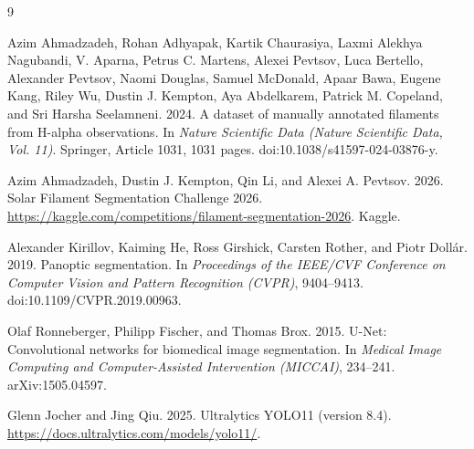\documentclass[sigconf]{acmart}
\begin{document}
\begin{thebibliography}{9}

Azim Ahmadzadeh, Rohan Adhyapak, Kartik Chaurasiya, Laxmi Alekhya Nagubandi, V. Aparna, Petrus C. Martens, Alexei Pevtsov, Luca Bertello, Alexander Pevtsov, Naomi Douglas, Samuel McDonald, Apaar Bawa, Eugene Kang, Riley Wu, Dustin J. Kempton, Aya Abdelkarem, Patrick M. Copeland, and Sri Harsha Seelamneni.
2024.
A dataset of manually annotated filaments from H-alpha observations.
In \emph{Nature Scientific Data (Nature Scientific Data, Vol. 11)}.
Springer, Article 1031, 1031 pages.
doi:10.1038/s41597-024-03876-y.

Azim Ahmadzadeh, Dustin J. Kempton, Qin Li, and Alexei A. Pevtsov.
2026.
Solar Filament Segmentation Challenge 2026.
\url{https://kaggle.com/competitions/filament-segmentation-2026}.
Kaggle.

Alexander Kirillov, Kaiming He, Ross Girshick, Carsten Rother, and Piotr Doll\'{a}r.
2019.
Panoptic segmentation.
In \emph{Proceedings of the IEEE/CVF Conference on Computer Vision and Pattern Recognition (CVPR)}, 9404--9413.
doi:10.1109/CVPR.2019.00963.

Olaf Ronneberger, Philipp Fischer, and Thomas Brox.
2015.
U-Net: Convolutional networks for biomedical image segmentation.
In \emph{Medical Image Computing and Computer-Assisted Intervention (MICCAI)}, 234--241.
arXiv:1505.04597.

Glenn Jocher and Jing Qiu.
2025.
Ultralytics YOLO11 (version 8.4).
\url{https://docs.ultralytics.com/models/yolo11/}.

\end{thebibliography}
\end{document}
